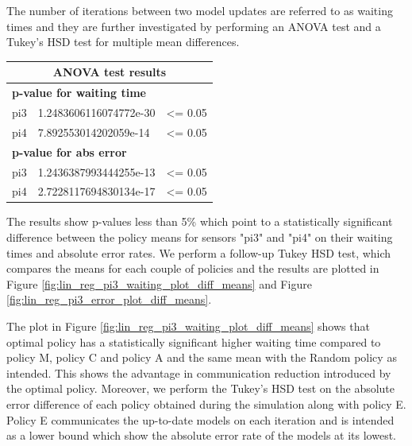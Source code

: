 \documentclass{mpaper}
\begin{document}
The number of iterations between two model updates are referred to as waiting times and they are further investigated by performing an ANOVA test and a Tukey's HSD test for multiple mean differences. 

\begin{table}[h]
\centering
\begin{tabular}{|l|l|l|}
\hline
\multicolumn{3}{|c|}{\cellcolor[HTML]{DAE8FC}\textbf{ANOVA test results}}       \\ \hline
\multicolumn{3}{|l|}{\cellcolor[HTML]{FFFFFF}\textbf{p-value for waiting time}} \\ \hline
pi3    & 1.2483606116074772e-30   & \textless{}= 0.05                           \\ \hline
pi4    & 7.892553014202059e-14    & \textless{}= 0.05                           \\ \hline
\multicolumn{3}{|l|}{\cellcolor[HTML]{FFFFFF}\textbf{p-value for abs error}}    \\ \hline
pi3    & 1.2436387993444255e-13   & \textless{}= 0.05                           \\ \hline
pi4    & 2.7228117694830134e-17   & \cellcolor[HTML]{FFFFFF}\textless{}= 0.05   \\ \hline
\end{tabular}
\end{table}

The results show p-values less than 5\% which point to a statistically significant difference between the policy means for sensors "pi3" and "pi4" on their waiting times and absolute error rates. We perform a follow-up Tukey HSD test, which compares the means for each couple of policies and the results are plotted in Figure \ref{fig:lin_reg_pi3_waiting_plot_diff_means} and Figure \ref{fig:lin_reg_pi3_error_plot_diff_means}.

The plot in Figure \ref{fig:lin_reg_pi3_waiting_plot_diff_means} shows that optimal policy has a statistically significant higher waiting time compared to policy M, policy C and policy A and the same mean with the Random policy as intended.
This shows the advantage in communication reduction introduced by the optimal policy.
Moreover, we perform the Tukey's HSD test on the absolute error difference of each policy obtained during the simulation along with policy E. Policy E communicates the up-to-date models on each iteration and is intended as a lower bound which show the absolute error rate of the models at its lowest. 
\end{document}
